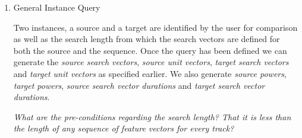 \documentclass[11pt]{article}
\begin{document}
\begin{enumerate}
\begin{enumerate}
\item \textsf{Instance Search Vector Durations}

Finally, we define a function called svdurations which takes a sequence of search vectors and calculates the track search vector durations for each sequence.

\begin{axdef}
	durationsIsv : \seq (\seq \Vdsl) \fun (\seq ContIntIndex) \fun \nat \fun  \seq (\seq \R) \\
\where
	\forall svss : \seq (\seq \Vdsl); sl : \nat; ciis :  \seq ContIntIndex @ \\
\t1 	 	durationsIsv ~ svss ~ ciis ~ sl =  \\
\t2		\langle durationsTsv  ~ (head ~ svss) ~ (head ~ ciis) ~ sl   \rangle  \cat \\
\t3  durationsIsv ~ (tail ~ svss) ~ (tail ~ ciis) ~ sl  \land \\
\t1		durationsIsv ~ \langle \rangle~ \langle \rangle ~ sl = \langle \rangle 
\end{axdef}

\end{enumerate}

\begin{schema}{Durations}
	SearchVectors \\
	svdurations! : \seq (\seq \R) \\	
\where
	svdurations! = durationsIsv ~ searchvs! ~ i?.index ~ sl? 
\end{schema}


\section{Making a Query}

\item \textsf{General Instance Query}

Two instances, a source and a target are identified by the user for comparison as well as the search length from which the search vectors are defined for both the source and the sequence.  Once the query has been defined we can generate the \emph{source search vectors},  \emph{source unit vectors},   \emph{target search vectors} and \emph{target unit vectors} as specified earlier. We also generate \emph{source powers}, \emph{target powers}, \emph{source search vector durations} and \emph{target search vector durations}. 

\emph{What are the pre-conditions regarding the search length? That it is less than the length of any sequence of feature vectors for every track?}


\end{enumerate}
\end{document}
